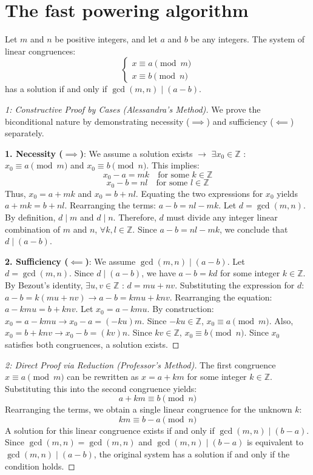 \section{The fast powering algorithm}

\begin{theorem}
Let $m$ and $n$ be positive integers, and let $a$ and $b$ be any integers. The system of linear congruences:
$$
\begin{cases}
x \equiv a \pmod{m} \\
x \equiv b \pmod{n}
\end{cases}
$$
has a solution if and only if $\gcd(m, n) \mid (a - b)$.
\end{theorem}
\begin{proof}[ 1: Constructive Proof by Cases (Alessandra's Method)]
We prove the biconditional nature by demonstrating necessity ($\implies$) and sufficiency ($\impliedby$) separately.

\textbf{1. Necessity ($\implies$)}: We assume a solution exists $\rightarrow$ $\exists x_0 \in \mathbb{Z}$ : $x_0 \equiv a \pmod{m}$ and $x_0 \equiv b \pmod{n}$.
This implies:
$$
x_0 - a = mk \quad \text{for some } k \in \mathbb{Z}
$$
$$
x_0 - b = nl \quad \text{for some } l \in \mathbb{Z}
$$
Thus, $x_0 = a + mk$ and $x_0 = b + nl$. Equating the two expressions for $x_0$ yields $a + mk = b + nl$.
Rearranging the terms: $a - b = nl - mk$.
Let $d = \gcd(m, n)$. By definition, $d \mid m$ and $d \mid n$. Therefore, $d$ must divide any integer linear combination of $m$ and $n$, $\forall k, l \in \mathbb{Z}$.
Since $a - b = nl - mk$, we conclude that $d \mid (a - b)$.

\textbf{2. Sufficiency ($\impliedby$)}: We assume $\gcd(m, n) \mid (a - b)$.
Let $d = \gcd(m, n)$. Since $d \mid (a - b)$, we have $a - b = kd$ for some integer $k \in \mathbb{Z}$.
By Bezout's identity, $\exists u, v \in \mathbb{Z}$ : $d = mu + nv$.
Substituting the expression for $d$: $a - b = k(mu + nv) \rightarrow a - b = kmu + knv$.
Rearranging the equation: $a - kmu = b + knv$.
Let $x_0 = a - kmu$. By construction:
$x_0 = a - kmu \rightarrow x_0 - a = (-ku)m$. Since $-ku \in \mathbb{Z}$, $x_0 \equiv a \pmod{m}$.
Also, $x_0 = b + knv \rightarrow x_0 - b = (kv)n$. Since $kv \in \mathbb{Z}$, $x_0 \equiv b \pmod{n}$.
Since $x_0$ satisfies both congruences, a solution exists.
\end{proof}

\begin{proof}[2: Direct Proof via Reduction (Professor's Method)]
The first congruence $x \equiv a \pmod{m}$ can be rewritten as $x = a + km$ for some integer $k \in \mathbb{Z}$.
Substituting this into the second congruence yields:
$$
a + km \equiv b \pmod{n}
$$
Rearranging the terms, we obtain a single linear congruence for the unknown $k$:
$$
km \equiv b - a \pmod{n}
$$
A solution for this linear congruence exists if and only if $\gcd(m, n) \mid (b - a)$.
Since $\gcd(m, n) = \gcd(m, n)$ and $\gcd(m, n) \mid (b - a)$ is equivalent to $\gcd(m, n) \mid (a - b)$, the original system has a solution if and only if the condition holds.
\end{proof}

